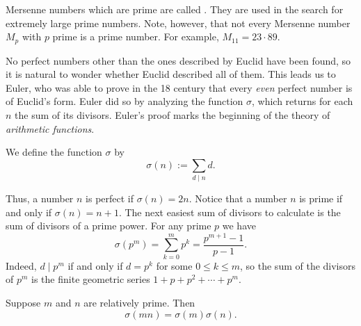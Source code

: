 Mersenne numbers which are prime are called . They are used in the search for extremely large prime numbers. Note, however, that not every Mersenne number $M_p$ with $p$ prime is a prime number. For example, $M_{11}=23\cdot 89$.

No perfect numbers other than the ones described by Euclid have been found, so it is natural to wonder whether Euclid described all of them. This leads us to Euler, who was able to prove in the 18\supth{} century that every \emph{even} perfect number is of Euclid's form. Euler did so by analyzing the function $\sigma$, which returns for each $n$ the sum of its divisors. Euler's proof marks the beginning of the theory of \emph{arithmetic functions}. 

\begin{definition}
  We define the  function $\sigma$ by
  \begin{equation*}
    \sigma(n):=\sum_{d\mid n}d.
  \end{equation*}
\end{definition}

Thus, a number $n$ is perfect if $\sigma(n)=2n$. Notice that a number $n$ is prime if and only if $\sigma(n)=n+1$. The next easiest sum of divisors to calculate is the sum of divisors of a prime power. For any prime $p$ we have
\begin{equation*}
  \sigma(p^m)=\sum_{k=0}^m p^k=\frac{p^{m+1}-1}{p-1}.
\end{equation*}
Indeed, $d\mid p^m$ if and only if $d=p^k$ for some $0\leq k\leq m$, so the sum of the divisors of $p^m$ is the finite geometric series $1+p+p^2+\cdots + p^m$.

\begin{proposition}
  Suppose $m$ and $n$ are relatively prime. Then
  \begin{equation*}
    \sigma(mn)=\sigma(m)\sigma(n).
  \end{equation*}
\end{proposition}

